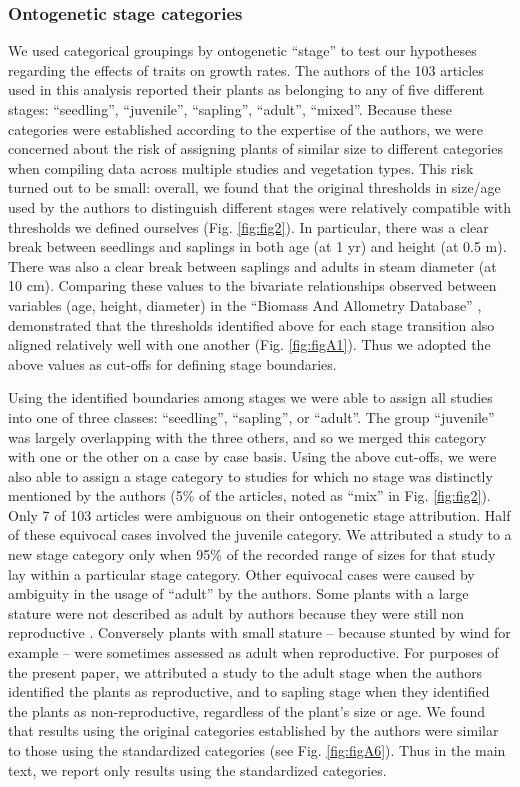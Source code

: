 \documentclass[a4paper,11pt]{article}
\begin{document}
\subsubsection*{Ontogenetic stage categories}

We used categorical groupings by ontogenetic ``stage'' to test our hypotheses regarding the effects of traits on growth rates. The authors of the 103 articles used in this analysis reported their plants as belonging to any of five different stages: ``seedling'', ``juvenile'', ``sapling'', ``adult'', ``mixed''. Because these categories were established according to the expertise of the authors, we were concerned about the risk of assigning plants of similar size to different categories when compiling data across multiple studies and vegetation types. This risk turned out to be small: overall, we found that the original thresholds in size/age used by the authors to distinguish different stages were relatively compatible with thresholds we defined ourselves (Fig. \ref{fig:fig2}). In particular, there was a clear break between seedlings and saplings in both age (at 1 yr) and height (at 0.5 m). There was also a clear break between saplings and adults in steam diameter (at 10 cm). Comparing these values to the bivariate relationships observed between variables (age, height, diameter) in the ``Biomass And Allometry Database'' \citep{Falster:2015}, demonstrated that the thresholds identified above for each stage transition also aligned relatively well with one another (Fig. \ref{fig:figA1}). Thus we adopted the above values as cut-offs for defining stage boundaries.

Using the identified boundaries among stages we were able to assign all studies into one of three classes: ``seedling'', ``sapling'', or ``adult''. The group ``juvenile'' was largely overlapping with the three others, and so we merged this category with one or the other on a case by case basis. Using the above cut-offs, we were also able to assign a stage category to studies for which no stage was distinctly mentioned by the authors (5\% of the articles, noted as ``mix'' in Fig. \ref{fig:fig2}). Only 7 of 103 articles were ambiguous on their ontogenetic stage attribution. Half of these equivocal cases involved the juvenile category. We attributed a study to a new stage category only when 95\% of the recorded range of sizes for that study lay within a particular stage category. Other equivocal cases were caused by ambiguity in the usage of ``adult'' by the authors. Some plants with a large stature were not described as adult by authors because they were still non reproductive \citep{King:2006he}. Conversely plants with small stature -- because stunted by wind for example \citep{Stratton:2001ck} -- were sometimes assessed as adult when reproductive. For purposes of the present paper, we attributed a study to the adult stage when the authors identified the plants as reproductive, and to sapling stage when they identified the plants as non-reproductive, regardless of the plant's size or age. We found that results using the original categories established by the authors were similar to those using the standardized categories (see Fig. \ref{fig:figA6}). Thus in the main text, we report only results using the standardized categories.
\end{document}
